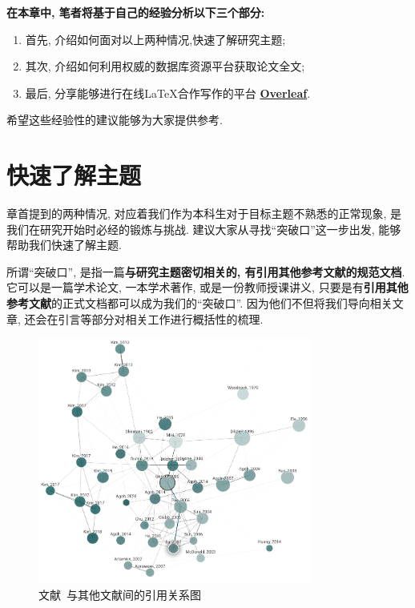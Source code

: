 \documentclass{formatBook}
\begin{document}
\textbf{在本章中, 笔者将基于自己的经验分析以下三个部分:}
\begin{enumerate}
    \item 首先, 介绍如何面对以上两种情况,快速了解研究主题;
    \item 其次, 介绍如何利用权威的数据库资源平台获取论文全文;
    \item 最后, 分享能够进行在线\LaTeX 合作写作的平台 \textbf{\href{https://www.overleaf.com/}{Overleaf}}.
\end{enumerate}

希望这些经验性的建议能够为大家提供参考.

\section{快速了解主题}
章首提到的两种情况, 对应着我们作为本科生对于目标主题不熟悉的正常现象, 是我们在研究开始时必经的锻炼与挑战. 建议大家从寻找``突破口''这一步出发, 能够帮助我们快速了解主题.

所谓``突破口'', 是指一篇\textbf{与研究主题密切相关的, 有引用其他参考文献的规范文档}. 它可以是一篇学术论文, 一本学术著作, 或是一份教师授课讲义, 只要是有\textbf{引用其他参考文献}的正式文档都可以成为我们的``突破口''. 因为他们不但将我们导向相关文章, 还会在引言等部分对相关工作进行概括性的梳理.

\begin{figure}[H]
    \centering
    \includegraphics[width=0.8\textwidth]{figure/graph.png}
    \caption{文献~\cite{GesselMiki2005}与其他文献间的引用关系图}
    \label{fig:mikiGrapg}
\end{figure}
\end{document}
